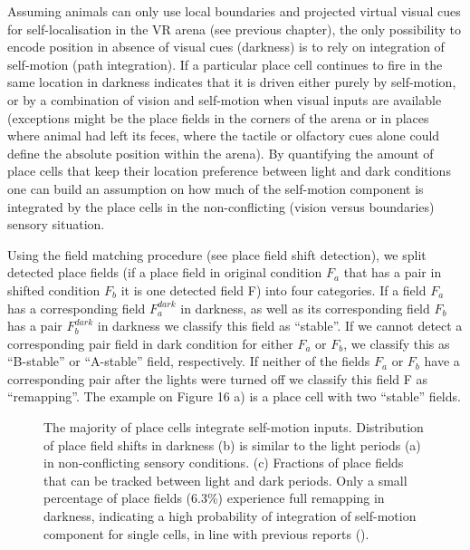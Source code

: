 Assuming animals can only use local boundaries and projected virtual visual cues for self-localisation in the VR arena (see previous chapter), the only possibility to encode position in absence of visual cues (darkness) is to rely on integration of self-motion (path integration). If a particular place cell continues to fire in the same location in darkness indicates that it is driven either purely by self-motion, or by a combination of vision and self-motion when visual inputs are available (exceptions might be the place fields in the corners of the arena or in places where animal had left its feces, where the tactile or olfactory cues alone could define the absolute position within the arena). By quantifying the amount of place cells that keep their location preference between light and dark conditions one can build an assumption on how much of the self-motion component is integrated by the place cells in the non-conflicting (vision versus boundaries) sensory situation.

Using the field matching procedure (see place field shift detection), we split detected place fields (if a place field in original condition $F_a$ that has a pair in shifted condition $F_b$ it is one detected field F) into four categories. If a field $F_a$ has a corresponding field $F_a^{dark}$ in darkness, as well as its corresponding field $F_b$ has a pair $F_b^{dark}$ in darkness we classify this field as “stable”. If we cannot detect a corresponding pair field in dark condition for either $F_a$ or $F_b$, we classify this as “B-stable” or “A-stable” field, respectively. If neither of the fields $F_a$ or $F_b$ have a corresponding pair after the lights were turned off we classify this field F as “remapping”. The example on Figure 16 a) is a place cell with two “stable” fields.

\begin{figure}
\captionsetup{format=plain}
\caption[Widespread integration of self-motion inputs]{
The majority of place cells integrate self-motion inputs. Distribution of place field shifts in darkness (b) is similar to the light periods (a) in non-conflicting sensory conditions. (c) Fractions of place fields that can be tracked between light and dark periods. Only a small percentage of place fields (6.3\%) experience full remapping in darkness, indicating a high probability of integration of self-motion component for single cells, in line with previous reports (\cite{Allen6245}).
}
\label{fig:F17_integration_of_sm_inputs}
\end{figure}

